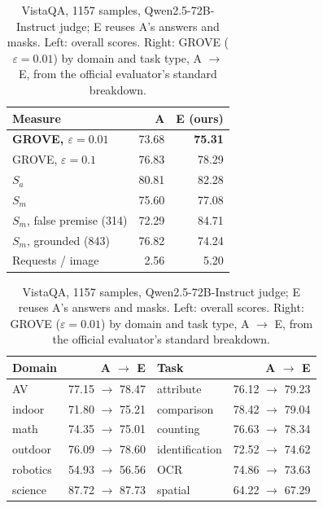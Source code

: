 \documentclass{article}
\begin{document}
\begin{table}[t]
  \caption{VistaQA, 1157 samples, Qwen2.5-72B-Instruct judge; E reuses A's answers and masks.
    Left: overall scores. Right: GROVE ($\varepsilon=0.01$) by domain and task type, A $\rightarrow$ E,
    from the official evaluator's standard breakdown.}
  \label{tab:vistaqa}
  \centering
  \footnotesize
  \setlength{\tabcolsep}{4pt}
  \begin{minipage}[t]{0.44\linewidth}
    \centering
    \begin{tabular}{lrr}
      \toprule
      Measure & A & E (ours) \\
      \midrule
      \textbf{GROVE, $\varepsilon=0.01$} & 73.68 & \textbf{75.31} \\
      GROVE, $\varepsilon=0.1$ & 76.83 & 78.29 \\
      $S_a$ & 80.81 & 82.28 \\
      $S_m$ & 75.60 & 77.08 \\
      $S_m$, false premise (314) & 72.29 & 84.71 \\
      $S_m$, grounded (843) & 76.82 & 74.24 \\
      Requests / image & 2.56 & 5.20 \\
      \bottomrule
    \end{tabular}
  \end{minipage}\hfill
  \begin{minipage}[t]{0.54\linewidth}
    \centering
    \begin{tabular}{lrlr}
      \toprule
      Domain & A $\rightarrow$ E & Task & A $\rightarrow$ E \\
      \midrule
      AV & 77.15 $\rightarrow$ 78.47 & attribute & 76.12 $\rightarrow$ 79.23 \\
      indoor & 71.80 $\rightarrow$ 75.21 & comparison & 78.42 $\rightarrow$ 79.04 \\
      math & 74.35 $\rightarrow$ 75.01 & counting & 76.63 $\rightarrow$ 78.34 \\
      outdoor & 76.09 $\rightarrow$ 78.60 & identification & 72.52 $\rightarrow$ 74.62 \\
      robotics & 54.93 $\rightarrow$ 56.56 & OCR & 74.86 $\rightarrow$ 73.63 \\
      science & 87.72 $\rightarrow$ 87.73 & spatial & 64.22 $\rightarrow$ 67.29 \\
      \bottomrule
    \end{tabular}
  \end{minipage}
\end{table}
\end{document}
